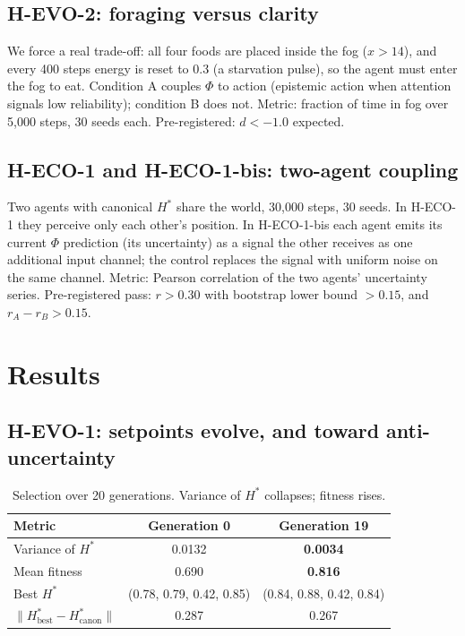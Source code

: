 \documentclass[11pt,a4paper]{article}
\begin{document}
\subsection{H-EVO-2: foraging versus clarity}
We force a real trade-off: all four foods are placed inside the fog ($x>14$), and every 400 steps energy is reset to 0.3 (a starvation pulse), so the agent must enter the fog to eat. Condition A couples $\Phi$ to action (epistemic action when attention signals low reliability); condition B does not. Metric: fraction of time in fog over 5,000 steps, 30 seeds each. Pre-registered: $d<-1.0$ expected.

\subsection{H-ECO-1 and H-ECO-1-bis: two-agent coupling}
Two agents with canonical $H^*$ share the world, 30,000 steps, 30 seeds. In H-ECO-1 they perceive only each other's position. In H-ECO-1-bis each agent emits its current $\Phi$ prediction (its uncertainty) as a signal the other receives as one additional input channel; the control replaces the signal with uniform noise on the same channel. Metric: Pearson correlation of the two agents' uncertainty series. Pre-registered pass: $r>0.30$ with bootstrap lower bound $>0.15$, and $r_A-r_B>0.15$.

\section{Results}

\subsection{H-EVO-1: setpoints evolve, and toward anti-uncertainty}

\begin{table}[h]
\centering
\caption{Selection over 20 generations. Variance of $H^*$ collapses; fitness rises.}
\label{tab:evo}
\begin{tabular}{@{}lcc@{}}
\toprule
Metric & Generation 0 & Generation 19 \\
\midrule
Variance of $H^*$ & 0.0132 & \textbf{0.0034} \\
Mean fitness & 0.690 & \textbf{0.816} \\
Best $H^*$ & (0.78, 0.79, 0.42, 0.85) & (0.84, 0.88, 0.42, 0.84) \\
$\|H^*_{\mathrm{best}} - H^*_{\mathrm{canon}}\|$ & 0.287 & 0.267 \\
\bottomrule
\end{tabular}
\end{table}
\end{document}
